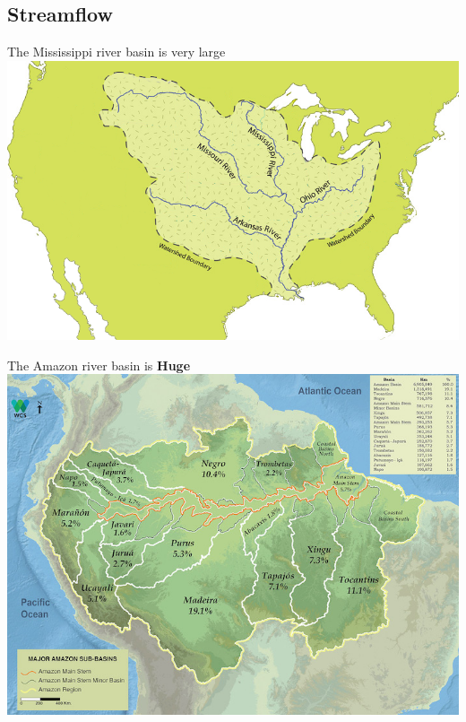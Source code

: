 \documentclass[
  letterpaper,
  DIV=11,
  numbers=noendperiod]{scrreprt}
\begin{document}
\hypertarget{streamflow}{%
\subsection{Streamflow}\label{streamflow}}

The Mississippi river basin is very large
\includegraphics{archive/figures/Mississippi_River_Watershed_Map_North_America.png}

The Amazon river basin is \textbf{Huge}
\includegraphics{archive/figures/amazon-basin.jpg}
\end{document}
